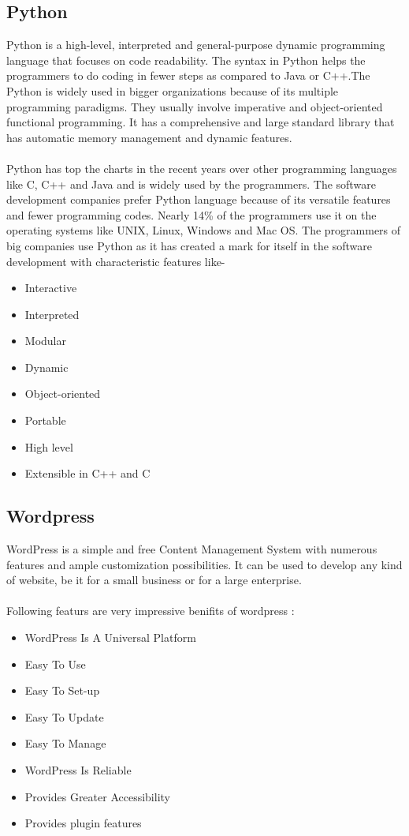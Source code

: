 \subsection{Python} 
Python is a high-level, interpreted and general-purpose dynamic programming language that focuses on code readability. The syntax in Python helps the programmers to do coding in fewer steps as compared to Java or C++.The Python is widely used in bigger organizations because of its multiple programming paradigms. They usually involve imperative and object-oriented functional programming. It has a comprehensive and large standard library that has automatic memory management and dynamic features.\cite{python}\\ \\
Python has top the charts in the recent years over other programming languages like C, C++ and Java and is widely used by the programmers. The software development companies prefer Python language because of its versatile features and fewer programming codes. Nearly 14\% of the programmers use it on the operating systems like UNIX, Linux, Windows and Mac OS. The programmers of big companies use Python as it has created a mark for itself in the software development with characteristic features like-
\begin{itemize}
    \item Interactive
    \item Interpreted
    \item Modular
    \item Dynamic
    \item Object-oriented
    \item Portable
    \item High level
    \item Extensible in C++ and  C
\end{itemize}
\subsection{Wordpress}
WordPress is a simple and free Content Management System with numerous features and ample customization possibilities. It can be used to develop any kind of website, be it for a small business or for a large enterprise. \cite{word} \\ \\
Following featurs are very impressive benifits of wordpress : 
\begin{itemize}
    \item WordPress Is A Universal Platform
    \item Easy To Use
    \item Easy To Set-up
    \item  Easy To Update
    \item  Easy To Manage
    \item WordPress Is Reliable
    \item Provides Greater Accessibility
    \item Provides plugin features
\end{itemize}
